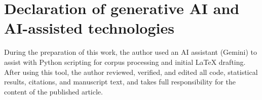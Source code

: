 \documentclass[cm]{glossa}
\begin{document}
\section*{Declaration of generative AI and AI-assisted technologies}
During the preparation of this work, the author used an AI assistant (Gemini) to assist with Python scripting for corpus processing and initial LaTeX drafting. After using this tool, the author reviewed, verified, and edited all code, statistical results, citations, and manuscript text, and takes full responsibility for the content of the published article.


\end{document}
